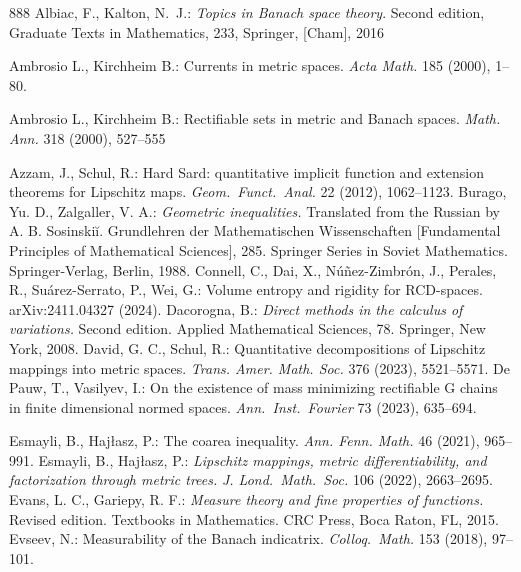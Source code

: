 \documentclass[12pt,leqno]{amsart}
\theoremstyle{definition}
\numberwithin{theorem}{section} \numberwithin{equation}{section}
\begin{document}
\begin{thebibliography}{888}
{\sc Albiac, F.,  Kalton, N.~J.:}
{\em Topics in Banach space theory}. Second edition,
Graduate Texts in Mathematics, 233, Springer, [Cham], 2016

{\sc Ambrosio L., Kirchheim B.:}
Currents in metric spaces. {\em Acta Math.} 185 (2000), 1--80.

{\sc Ambrosio L., Kirchheim B.:} Rectifiable sets in metric and Banach spaces.  {\em Math. Ann.} 318 (2000), 527--555

{\sc  Azzam, J., Schul, R.:}
Hard Sard: quantitative implicit function and extension theorems for Lipschitz maps.
{\em Geom.\ Funct.\ Anal.} 22 (2012), 1062--1123.
%
%
{\sc Burago, Yu. D., Zalgaller, V. A.:} {\em Geometric inequalities.} Translated from the Russian by A. B. Sosinskiĭ. Grundlehren der Mathematischen Wissenschaften [Fundamental Principles of Mathematical Sciences], 285. Springer Series in Soviet Mathematics. Springer-Verlag, Berlin, 1988.
%
{\sc Connell, C., Dai, X., Núñez-Zimbrón, J., Perales, R., Suárez-Serrato, P., Wei, G.:} Volume entropy and rigidity for RCD-spaces. arXiv:2411.04327 (2024).
%
{\sc  Dacorogna, B.:} {\em Direct methods in the calculus of variations.} Second edition. Applied Mathematical Sciences, 78. Springer, New York, 2008.
%
%
{\sc David, G. C., Schul, R.:}
Quantitative decompositions of Lipschitz mappings into metric spaces. {\em Trans. Amer. Math. Soc. } 376 (2023), 5521--5571.
%
%
{\sc De Pauw, T., Vasilyev, I.:}
On the existence of mass minimizing rectifiable G chains in finite dimensional normed spaces.
{\em Ann.\ Inst.\ Fourier} 73 (2023), 635--694.

{\sc Esmayli, B., Haj\l{}asz, P.:}
The coarea inequality.
{\em Ann. Fenn. Math.} 46 (2021), 965--991.
%
{\sc Esmayli, B., Haj\l{}asz, P.:}
{\em Lipschitz mappings, metric differentiability, and factorization through metric trees.}
{\em J. Lond.\ Math.\ Soc.} 106 (2022), 2663--2695.
%
{\sc Evans, L. C., Gariepy, R. F.:}
{\em Measure theory and fine properties of functions.}
Revised edition. Textbooks in Mathematics. CRC Press, Boca Raton, FL, 2015.
%
{\sc Evseev, N.:}
Measurability of the Banach indicatrix.
{\em Colloq.\ Math.} 153 (2018), 97--101.



\end{thebibliography}
\end{document}
